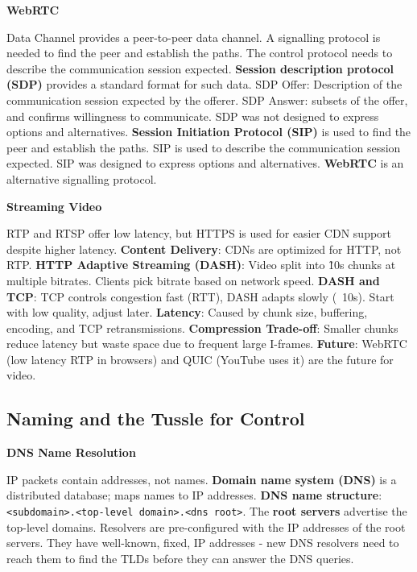 \documentclass{article}
\begin{document}
\vspace{\baselineskip}
\textbf{WebRTC}

Data Channel provides a peer-to-peer data channel.
A signalling protocol is needed to find the peer and establish the paths.
The control protocol needs to describe the communication session expected.
\textbf{Session description protocol (SDP)} provides a standard format for such data.
SDP Offer: Description of the communication session expected by the offerer.
SDP Answer: subsets of the offer, and confirms willingness to communicate.
SDP was not designed to express options and alternatives.
\textbf{Session Initiation Protocol (SIP)} is used to find the peer and establish the paths.
SIP is used to describe the communication session expected.
SIP was designed to express options and alternatives.
\textbf{WebRTC} is an alternative signalling protocol.

\vspace{\baselineskip}
\textbf{Streaming Video}

RTP and RTSP offer low latency, but HTTPS is used for easier CDN support despite higher latency.
\textbf{Content Delivery}:
CDNs are optimized for HTTP, not RTP\@.
\textbf{HTTP Adaptive Streaming (DASH)}:
Video split into \~10s chunks at multiple bitrates. Clients pick bitrate based on network speed.
\textbf{DASH and TCP}:
TCP controls congestion fast (RTT), DASH adapts slowly (~10s). Start with low quality, adjust later.
\textbf{Latency}:
Caused by chunk size, buffering, encoding, and TCP retransmissions.
\textbf{Compression Trade-off}:
Smaller chunks reduce latency but waste space due to frequent large I-frames.
\textbf{Future}:
WebRTC (low latency RTP in browsers) and QUIC (YouTube uses it) are the future for video.

\clearpage

\subsection*{Naming and the Tussle for Control}

\vspace{\baselineskip}
\textbf{DNS Name Resolution}

IP packets contain addresses, not names.
\textbf{Domain name system (DNS)} is a distributed database; maps names to IP addresses.
\textbf{DNS name structure}: \texttt{<subdomain>.<top-level domain>.<dns root>}.
The \textbf{root servers} advertise the top-level domains.
Resolvers are pre-configured with the IP addresses of the root servers.
They have well-known, fixed, IP addresses {-} new DNS resolvers need to reach them to find the TLDs before they can answer the DNS queries.
\end{document}
